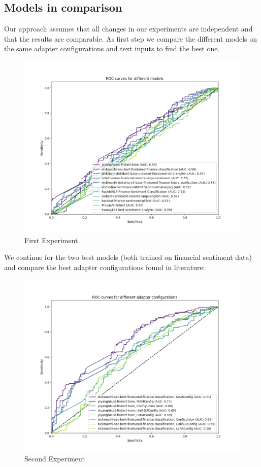 \documentclass[conference]{IEEEtran}
\begin{document}
\subsection{Models in comparison}%
Our approach assumes that all changes in our experiments are independent and that the results are comparable. As first step we compare the different models on the same adapter configurations and text inputs to find the best one.

\begin{figure}[h!]
    \centering
    \includegraphics[width=.85\linewidth]{../3. evaluation/roc_curves/First Experiment.png}
    \caption[First Experiment]{First Experiment}
    \label{fig:Firstexp}
\end{figure}
We continue for the two best models (both trained on financial sentiment data) and compare the best adapter configurations found in literature:

\begin{figure}[h!]
    \centering
    \includegraphics[width=.85\linewidth]{../3. evaluation/roc_curves/Second Experiment.png}
    \caption[Second Experiment]{Second Experiment}
    \label{fig:Secondexp}
\end{figure}
\end{document}
